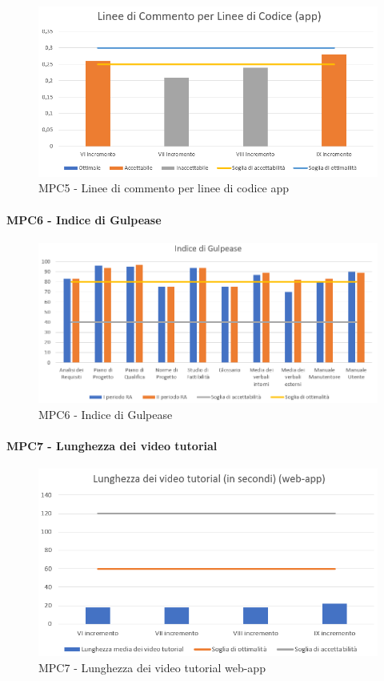   \begin{figure}[h!]
    \centering
      \includegraphics[scale=0.8]{Immagini/lineeCommLineeCod APPA.PNG}
    \caption{MPC5 - Linee di commento per linee di codice app}
  \end{figure}



  \clearpage
  \paragraph{MPC6 - Indice di Gulpease}
  \begin{figure}[h!]
    \centering
      \includegraphics[scale=0.7]{Immagini/IndGulpA.PNG}
    \caption{MPC6 - Indice di Gulpease}
  \end{figure}



  \clearpage
  \paragraph{MPC7 - Lunghezza dei video tutorial}
  \begin{figure}[h!]
    \centering
      \includegraphics[scale=1]{Immagini/lunghVideoTut WAA.PNG}
    \caption{MPC7 - Lunghezza dei video tutorial web-app}
  \end{figure}

